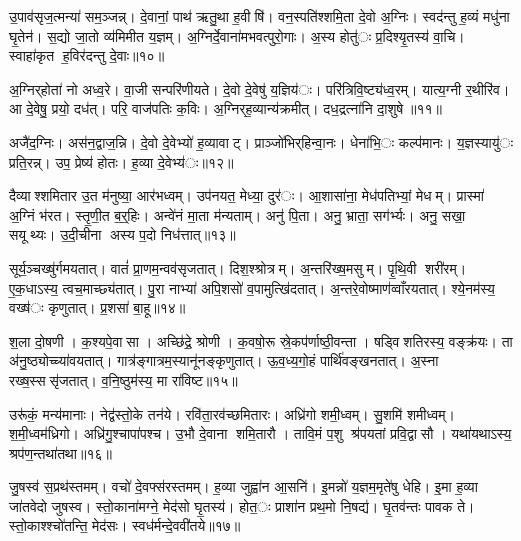 उ॒पाव॑सृज॒त्मन्या॑ सम॒ञ्जन्न्। दे॒वानां॒ पाथ॑ ऋतु॒था ह॒वीषि॑। वन॒स्पति॑श्शमि॒ता दे॒वो अ॒ग्निः। स्वद॑न्तु ह॒व्यं मधु॑ना घृ॒तेन॑। स॒द्यो जा॒तो व्य॑मिमीत य॒ज्ञम्। अ॒ग्निर्दे॒वाना॑मभवत्पुरो॒गाः। अ॒स्य होतु॑ः प्र॒दिश्यृ॒तस्य॑ वा॒चि। स्वाहा॑कृत ह॒विर॑दन्तु दे॒वाः॥१०॥


अ॒ग्निर्‌होता॑ नो अध्व॒रे। वा॒जी सन्परि॑णीयते। दे॒वो दे॒वेषु॑ य॒ज्ञिय॑ः। परि॑त्रिवि॒ष्ट्य॑ध्व॒रम्। यात्य॒ग्नी र॒थीरि॑व। आ दे॒वेषु॒ प्रयो॒ दध॑त्। परि॒ वाज॑पतिः क॒विः। अ॒ग्निर्‌ह॒व्यान्य॑क्रमीत्। दध॒द्रत्ना॑नि दा॒शुषे॥११॥


अजै॑द॒ग्निः। अस॑न॒द्वाज॒न्नि। दे॒वो दे॒वेभ्यो॑ ह॒व्यावाट्। प्राञ्जो॑भिर्‌हिन्वा॒नः। धेना॑भि॒ः कल्प॑मानः। य॒ज्ञस्यायु॑ः प्रति॒रन्न्। उप॒ प्रेष्य॑ होतः। ह॒व्या दे॒वेभ्य॑ः॥१२॥


दैव्याश्शमितार उ॒त म॑नुष्या॒ आर॑भध्वम्। उप॑नयत॒ मेध्या॒ दुर॑ः। आ॒शासा॑ना॒ मेध॑पतिभ्यां॒ मेधम्। प्रास्मा॑ अ॒ग्निं भ॑रत। स्तृ॒णी॒त ब॒र्॒हिः। अन्वे॑नं मा॒ता म॑न्यताम्। अनु॑ पि॒ता। अनु॒ भ्राता॒ सग॑र्भ्यः। अनु॒ सखा॒ सयूथ्यः। उ॒दी॒चीना अस्य प॒दो निध॑त्तात्॥१३॥

सूर्य॒ञ्चख्षु॑र्गमयतात्। वातं॑ प्रा॒णम॒न्वव॑सृजतात्। दिश॒श्श्रोत्रम्। अ॒न्तरि॑ख्ष॒मसुम्। पृ॒थि॒वी शरी॑रम्। ए॒क॒धाऽस्य॒ त्वच॒माच्छ्य॑तात्। पु॒रा नाभ्या॑ अपि॒शसो॑ व॒पामुत्खि॑दतात्। अ॒न्तरे॒वोष्माण॑व्वाँरयतात्। श्ये॒नम॑स्य॒ वख्ष॑ः कृणुतात्। प्र॒शसा॑ बा॒हू॥१४॥

श॒ला दो॒षणी। क॒श्यपे॒वासा। अच्छि॑द्रे॒ श्रोणी। क॒वषो॒रू स्रे॒कप॑र्णाष्ठी॒वन्ता। षड्विशतिरस्य॒ वङ्क्र॑यः। ता अ॑नु॒ष्ठ्योच्च्या॑वयतात्। गात्र॑ङ्गात्रम॒स्यानू॑नङ्कृणुतात्। ऊ॒व॒ध्य॒गो॒हं पार्थि॑वङ्खनतात्। अ॒स्ना रख्ष॒स्ससृ॑जतात्। व॒नि॒ष्ठुम॑स्य॒ मा रा॑विष्ट॥१५॥

उरू॑कं॒ मन्य॑मानाः। नेद्व॑स्तो॒के तन॑ये। रवि॑ता॒रव॑च्छमितारः। अध्रि॑गो शमी॒ध्वम्। सु॒शमि॑ शमीध्वम्। श॒मी॒ध्वम॑ध्रिगो। अध्रि॑गु॒श्चापा॑पश्च। उ॒भौ दे॒वाना शमि॒तारौ। तावि॒मं प॒शु श्र॑पयतां प्रवि॒द्वासौ। यथा॑यथाऽस्य॒ श्रप॑ण॒न्तथा॑तथा॥१६॥


जु॒षस्व॑ स॒प्रथ॑स्तमम्। वचो॑ दे॒वफ्स॑रस्तमम्। ह॒व्या जुह्वा॑न आ॒सनि॑। इ॒मन्नो॑ य॒ज्ञम॒मृते॑षु धेहि। इ॒मा ह॒व्या जा॑तवेदो जुषस्व। स्तो॒काना॑मग्ने॒ मेद॑सो घृ॒तस्य॑। होत॒ः प्राशा॑न प्रथ॒मो नि॒षद्य॑। घृ॒तव॑न्तः पावक ते। स्तो॒काश्श्चो॑तन्ति॒ मेद॑सः। स्वध॑र्मन्दे॒ववी॑तये॥१७॥

